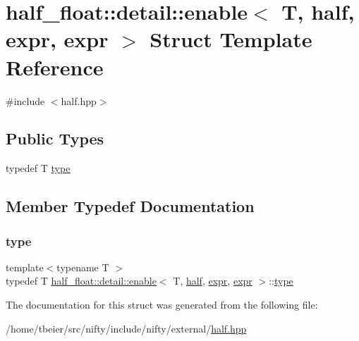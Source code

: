 \hypertarget{structhalf__float_1_1detail_1_1enable_3_01T_00_01half_00_01expr_00_01expr_01_4}{}\section{half\+\_\+float\+:\+:detail\+:\+:enable$<$ T, half, expr, expr $>$ Struct Template Reference}
\label{structhalf__float_1_1detail_1_1enable_3_01T_00_01half_00_01expr_00_01expr_01_4}


{\ttfamily \#include $<$half.\+hpp$>$}

\subsection*{Public Types}
\begin{DoxyCompactItemize}
\item 
typedef T \hyperlink{structhalf__float_1_1detail_1_1enable_3_01T_00_01half_00_01expr_00_01expr_01_4_a42da82c2195536cc977d291a06ba7de9}{type}
\end{DoxyCompactItemize}


\subsection{Member Typedef Documentation}
\mbox{\label{structhalf__float_1_1detail_1_1enable_3_01T_00_01half_00_01expr_00_01expr_01_4_a42da82c2195536cc977d291a06ba7de9}} 
\subsubsection{\texorpdfstring{type}{type}}
{\footnotesize\ttfamily template$<$typename T $>$ \\
typedef T \hyperlink{structhalf__float_1_1detail_1_1enable}{half\+\_\+float\+::detail\+::enable}$<$ T, \hyperlink{classhalf__float_1_1half}{half}, \hyperlink{structhalf__float_1_1detail_1_1expr}{expr}, \hyperlink{structhalf__float_1_1detail_1_1expr}{expr} $>$\+::\hyperlink{structhalf__float_1_1detail_1_1enable_3_01T_00_01half_00_01expr_00_01expr_01_4_a42da82c2195536cc977d291a06ba7de9}{type}}



The documentation for this struct was generated from the following file\+:\begin{DoxyCompactItemize}
\item 
/home/tbeier/src/nifty/include/nifty/external/\hyperlink{half_8hpp}{half.\+hpp}\end{DoxyCompactItemize}
